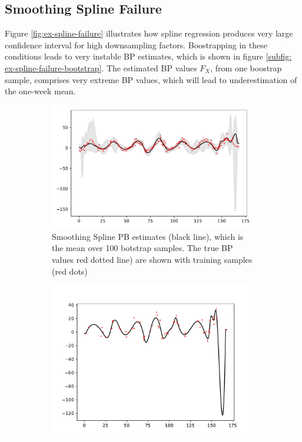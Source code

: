 \subsection{Smoothing Spline Failure}
Figure \ref{fig:ex-spline-failure} illustrates how spline regression
produces  very
large confidence interval for high downsampling factors.
Boostrapping in these conditions leads to very instable BP estimates,
which is shown in figure \ref{subfig: ex-spline-failure-bootstrap}.
The estimated BP values $F_X$, from one boostrap sample, comprises very extreme BP values, which will
lead to underestimation of the one-week mean.




\begin{figure}[!htb]
\centering
\begin{subfigure}{.5\textwidth}
    \centering
    \includegraphics[width=\linewidth]{Pictures/spline_extreme/plot_posterior_confint_spline}
    \caption{Smoothing Spline PB estimates (black line), which is the mean over 100 botstrap samples.
    The true BP values red dotted line) are shown with training samples (red dots)}
\end{subfigure}\hfill
\begin{subfigure}{.42\textwidth}
    \centering
    \includegraphics[width=\linewidth]{Pictures/spline_extreme/plot_pred_bootstrap_spline_reg_v2_70}

\end{subfigure}
\end{figure}
